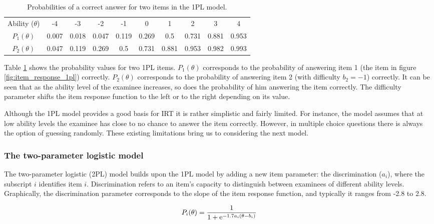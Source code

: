 \begin{table}[H] 
\centering
\begin{tabular}{c c c c c c c c c c}
\hline
Ability ($\theta$) & -4 & -3 & -2 & -1 & 0 & 1 & 2 & 3 & 4 \\
$P_1(\theta)$ & 0.007 & 0.018 & 0.047 & 0.119 & 0.269 & 0.5 & 0.731 & 0.881 & 0.953 \\
$P_2(\theta)$ & 0.047 & 0.119 & 0.269 & 0.5 & 0.731 & 0.881 & 0.953 & 0.982 & 0.993  \\
\hline
\end{tabular} 
\caption{Probabilities of a correct answer for two items in the 1PL model.}
\label{table:1PL_table}
\end{table}

Table \ref{table:1PL_table} shows the probability values for two 1PL items. $P_1(\theta)$ corresponds to the probability of answering item 1 (the item in figure \ref{fig:item_response_1pl}) correctly. $P_2(\theta)$ corresponds to the probability of answering item 2 (with difficulty $b_2=-1$) correctly. It can be seen that as the ability level of the examinee increases, so does the probability of him answering the item correctly. The difficulty parameter shifts the item response function to the left or to the right depending on its value. \newline

Although the 1PL model provides a good basis for IRT it is rather simplistic and fairly limited. For instance, the model assumes that at low ability levels the examinee has close to no chance to answer the item correctly. However, in multiple choice questions there is always the option of guessing randomly. These existing limitations bring us to considering the next model.

\subsubsection{The two-parameter logistic model}
The two-parameter logistic (2PL) model builds upon the 1PL model by adding a new item parameter: the discrimination ($a_i$), where the subscript $i$ identifies item $i$. Discrimination refers to an item's capacity to distinguish between examinees of different ability levels. Graphically, the discrimination parameter corresponds to the slope of the item response function, and typically it ranges from -2.8 to 2.8.

\begin{equation} \label{eq:2PL-IRF}
P_i(\theta) = \frac{1}{1 + \mathrm{e}^{-1.7a_i(\theta - b_i)}}
\end{equation}

